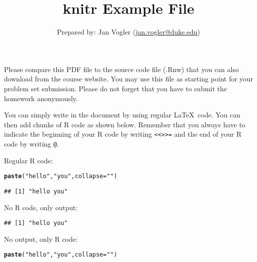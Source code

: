\documentclass{article}\usepackage[]{graphicx}\usepackage[]{color}
\makeatletter
\newcommand{\hlstr}[1]{\textcolor[rgb]{0.192,0.494,0.8}{#1}}%
\newcommand{\hlstd}[1]{\textcolor[rgb]{0.345,0.345,0.345}{#1}}%
\newcommand{\hlkwc}[1]{\textcolor[rgb]{0.333,0.667,0.333}{#1}}%
\newcommand{\hlkwd}[1]{\textcolor[rgb]{0.737,0.353,0.396}{\textbf{#1}}}%
\newenvironment{kframe}{%
 \def\at@end@of@kframe{}%
 \ifinner\ifhmode%
  \def\at@end@of@kframe{\end{minipage}}%
  \begin{minipage}{\columnwidth}%
 \fi\fi%
 \def\FrameCommand##1{\hskip\@totalleftmargin \hskip-\fboxsep
 \colorbox{shadecolor}{##1}\hskip-\fboxsep
     \hskip-\linewidth \hskip-\@totalleftmargin \hskip\columnwidth}%
 \MakeFramed {\advance\hsize-\width
   \@totalleftmargin\z@ \linewidth\hsize
   \@setminipage}}%
 {\par\unskip\endMakeFramed%
 \at@end@of@kframe}
\newenvironment{knitrout}{}{} %
\makeatother
\begin{document}
\author{Prepared by: Jan Vogler (\href{mailto:jan.vogler@duke.edu}{jan.vogler@duke.edu})}

\title{knitr Example File}

\maketitle

Please compare this PDF file to the source code file (.Rnw) that you can also download from the course website. You may use this file as starting point for your problem set submission. Please do not forget that you have to submit the homework anonymously.

\bigskip

You can simply write in the document by using regular \LaTeX \ code. You can then add chunks of R code as shown below. Remember that you always have to indicate the beginning of your R code by writing \texttt{<<>>=} and the end of your R code by writing \texttt{@}.

\bigskip

Regular R code:

\begin{knitrout}
\color{fgcolor}\begin{kframe}
\begin{alltt}
\hlkwd{paste}\hlstd{(}\hlstr{"hello"}\hlstd{,}\hlstr{"you"}\hlstd{,}\hlkwc{collapse}\hlstd{=}\hlstr{" "}\hlstd{)}
\end{alltt}
\begin{verbatim}
## [1] "hello you"
\end{verbatim}
\end{kframe}
\end{knitrout}

No R code, only output:

\begin{knitrout}
\color{fgcolor}\begin{kframe}
\begin{verbatim}
## [1] "hello you"
\end{verbatim}
\end{kframe}
\end{knitrout}

No output, only R code:

\begin{knitrout}
\color{fgcolor}\begin{kframe}
\begin{alltt}
\hlkwd{paste}\hlstd{(}\hlstr{"hello"}\hlstd{,}\hlstr{"you"}\hlstd{,}\hlkwc{collapse}\hlstd{=}\hlstr{" "}\hlstd{)}
\end{alltt}
\end{kframe}
\end{knitrout}
\end{document}
